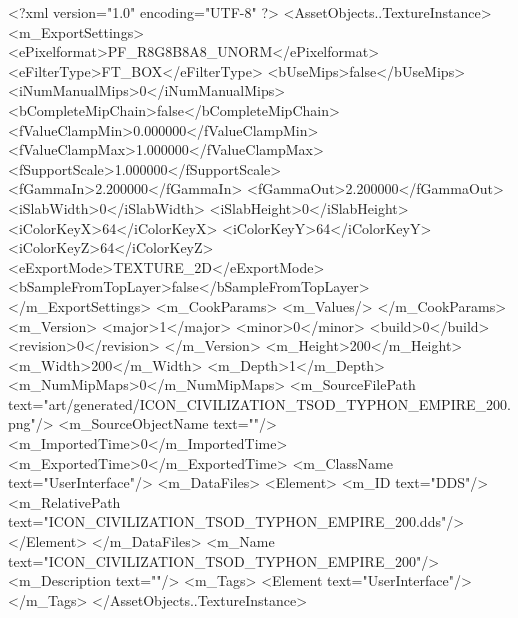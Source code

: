 <?xml version="1.0" encoding="UTF-8" ?>
<AssetObjects..TextureInstance>
	<m_ExportSettings>
		<ePixelformat>PF_R8G8B8A8_UNORM</ePixelformat>
		<eFilterType>FT_BOX</eFilterType>
		<bUseMips>false</bUseMips>
		<iNumManualMips>0</iNumManualMips>
		<bCompleteMipChain>false</bCompleteMipChain>
		<fValueClampMin>0.000000</fValueClampMin>
		<fValueClampMax>1.000000</fValueClampMax>
		<fSupportScale>1.000000</fSupportScale>
		<fGammaIn>2.200000</fGammaIn>
		<fGammaOut>2.200000</fGammaOut>
		<iSlabWidth>0</iSlabWidth>
		<iSlabHeight>0</iSlabHeight>
		<iColorKeyX>64</iColorKeyX>
		<iColorKeyY>64</iColorKeyY>
		<iColorKeyZ>64</iColorKeyZ>
		<eExportMode>TEXTURE_2D</eExportMode>
		<bSampleFromTopLayer>false</bSampleFromTopLayer>
	</m_ExportSettings>
	<m_CookParams>
		<m_Values/>
	</m_CookParams>
	<m_Version>
		<major>1</major>
		<minor>0</minor>
		<build>0</build>
		<revision>0</revision>
	</m_Version>
	<m_Height>200</m_Height>
	<m_Width>200</m_Width>
	<m_Depth>1</m_Depth>
	<m_NumMipMaps>0</m_NumMipMaps>
	<m_SourceFilePath text="art/generated/ICON_CIVILIZATION_TSOD_TYPHON_EMPIRE_200.png"/>
	<m_SourceObjectName text=""/>
	<m_ImportedTime>0</m_ImportedTime>
	<m_ExportedTime>0</m_ExportedTime>
	<m_ClassName text="UserInterface"/>
	<m_DataFiles>
		<Element>
			<m_ID text="DDS"/>
			<m_RelativePath text="ICON_CIVILIZATION_TSOD_TYPHON_EMPIRE_200.dds"/>
		</Element>
	</m_DataFiles>
	<m_Name text="ICON_CIVILIZATION_TSOD_TYPHON_EMPIRE_200"/>
	<m_Description text=""/>
	<m_Tags>
		<Element text="UserInterface"/>
	</m_Tags>
</AssetObjects..TextureInstance>

